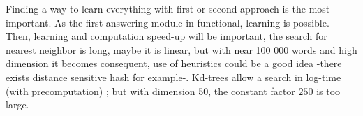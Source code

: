 Finding a way to learn everything with first or second approach is the most important. As the first answering module in functional, learning is possible. Then, learning and computation speed-up will be important, the search for nearest neighbor is long, maybe it is linear, but with near 100 000 words and high dimension it becomes consequent, use of heuristics could be a good idea -there exists distance sensitive hash for example-. Kd-trees allow a search in log-time (with precomputation) ; but with dimension 50, the constant factor $250$ is too large. 

